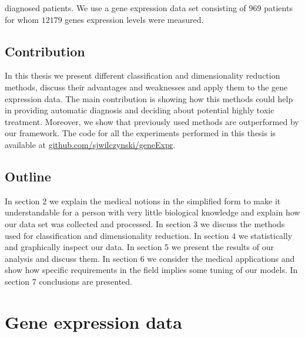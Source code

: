 \documentclass[12pt, wide]{mwart}
\begin{document}
diagnosed patients. We use a gene expression data set consisting of $969$ patients for whom $12179$ genes expression levels were measured.

\subsection{Contribution}

In this thesis we present different classification and dimensionality reduction methods, discuss their advantages and weaknesses and apply them to the gene expression data. The main contribution is showing how this methods could help in providing automatic diagnosis and deciding about potential highly toxic treatment. Moreover, we show that previously used methods are outperformed by our framework. The code for all the experiments performed in this thesis is available at \url{github.com/sjwilczynski/geneExpr}.  

\subsection{Outline}
In section 2 we explain the medical notions in the simplified form to make it understandable for a person with very little biological knowledge and explain how our data set was collected and processed. In section 3 we discuss the methods used for classification and dimensionality reduction. In section 4 we statistically and graphically inspect our data. In section 5 we present the results of our analysis and discuss them. In section 6 we consider the medical applications and show how specific requirements in the field implies some tuning of our models. In section 7 conclusions are presented.

\section{Gene expression data}
\end{document}
